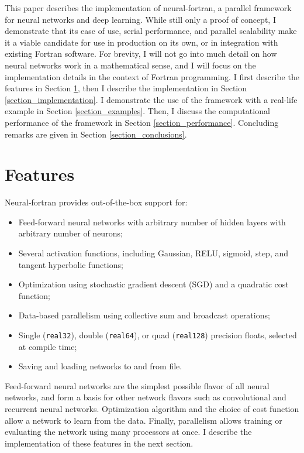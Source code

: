 \documentclass[sigplan, review=false, screen=true, balance=true]{acmart}
\begin{document}
This paper describes the implementation of neural-fortran, a parallel
framework for neural networks and deep learning. While still only a
proof of concept, I demonstrate that its ease of use, serial performance, and
parallel scalability make it a viable candidate for use in production on its
own, or in integration with existing Fortran software. For brevity, I will not
go into much detail on how neural networks work in a mathematical sense, and I
will focus on the implementation details in the context of Fortran programming.
I first describe the features in Section \ref{section_features}, then I describe
the implementation in Section \ref{section_implementation}. I demonstrate the
use of the framework with a real-life example in Section \ref{section_examples}.
Then, I discuss the computational performance of the framework in Section
\ref{section_performance}. Concluding remarks are given in Section
\ref{section_conclusions}.

\section{Features} \label{section_features}

Neural-fortran provides out-of-the-box support for:

\begin{itemize}
  \item Feed-forward neural networks with arbitrary number of hidden layers with
  arbitrary number of neurons;
  \item Several activation functions, including Gaussian, RELU, sigmoid, step,
  and tangent hyperbolic functions;
  \item Optimization using stochastic gradient descent (SGD) \citep{rumelhart86}
  and a quadratic cost function;
  \item Data-based parallelism using collective sum and broadcast operations;
  \item Single (\lstinline{real32}), double (\lstinline{real64}), or quad
  (\lstinline{real128}) precision floats, selected at compile time;
  \item Saving and loading networks to and from file.
\end{itemize}

Feed-forward neural networks are the simplest possible flavor of all neural
networks, and form a basis for other network flavors such as convolutional
\citep{krizhevsky12} and recurrent \citep{hochreiter97} neural networks.
Optimization algorithm and the choice of cost function allow a network
to learn from the data. Finally, parallelism allows training or evaluating the
network using many processors at once. I describe the implementation of these
features in the next section.
\end{document}
